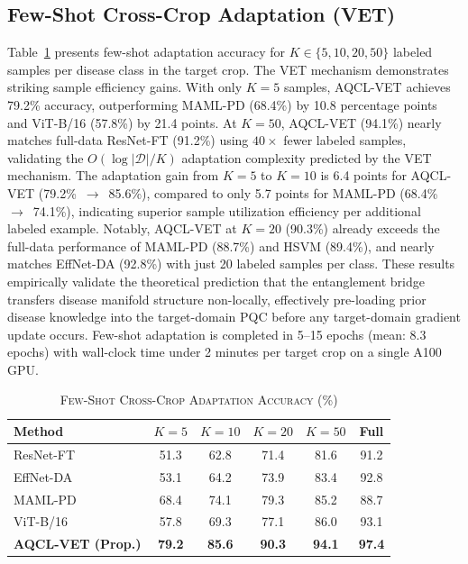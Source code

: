 \documentclass[conference]{IEEEtran}
\begin{document}
\subsection{Few-Shot Cross-Crop Adaptation (VET)}

Table~\ref{tab:fewshot} presents few-shot adaptation accuracy for $K \in \{5, 10, 20, 50\}$ labeled samples per disease class in the target crop. The VET mechanism demonstrates striking sample efficiency gains. With only $K = 5$ samples, AQCL-VET achieves 79.2\% accuracy, outperforming MAML-PD (68.4\%) by 10.8 percentage points and ViT-B/16 (57.8\%) by 21.4 points. At $K = 50$, AQCL-VET (94.1\%) nearly matches full-data ResNet-FT (91.2\%) using $40\times$ fewer labeled samples, validating the $O(\log|\mathcal{D}|/K)$ adaptation complexity predicted by the VET mechanism. The adaptation gain from $K = 5$ to $K = 10$ is 6.4 points for AQCL-VET (79.2\%~$\to$~85.6\%), compared to only 5.7 points for MAML-PD (68.4\%~$\to$~74.1\%), indicating superior sample utilization efficiency per additional labeled example. Notably, AQCL-VET at $K = 20$ (90.3\%) already exceeds the full-data performance of MAML-PD (88.7\%) and HSVM (89.4\%), and nearly matches EffNet-DA (92.8\%) with just 20 labeled samples per class. These results empirically validate the theoretical prediction that the entanglement bridge transfers disease manifold structure non-locally, effectively pre-loading prior disease knowledge into the target-domain PQC before any target-domain gradient update occurs. Few-shot adaptation is completed in 5--15 epochs (mean: 8.3 epochs) with wall-clock time under 2 minutes per target crop on a single A100 GPU.

\begin{table}[htbp]
\caption{\textsc{Few-Shot Cross-Crop Adaptation Accuracy (\%)}}
\label{tab:fewshot}
\centering
\begin{tabular}{lccccc}
\toprule
\textbf{Method} & $K{=}5$ & $K{=}10$ & $K{=}20$ & $K{=}50$ & \textbf{Full} \\
\midrule
ResNet-FT              & 51.3 & 62.8 & 71.4 & 81.6 & 91.2 \\
EffNet-DA              & 53.1 & 64.2 & 73.9 & 83.4 & 92.8 \\
MAML-PD                & 68.4 & 74.1 & 79.3 & 85.2 & 88.7 \\
ViT-B/16               & 57.8 & 69.3 & 77.1 & 86.0 & 93.1 \\
\textbf{AQCL-VET (Prop.)} & \textbf{79.2} & \textbf{85.6} & \textbf{90.3} & \textbf{94.1} & \textbf{97.4} \\
\bottomrule
\end{tabular}
\end{table}
\end{document}
